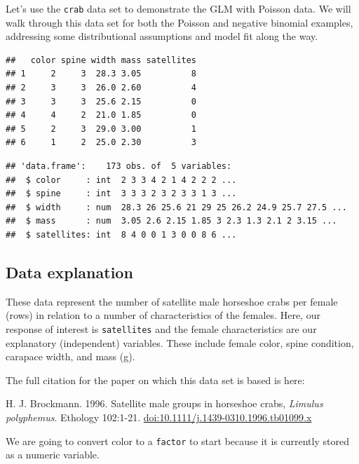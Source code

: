\documentclass[
]{book}
\newenvironment{Shaded}{\begin{snugshade}}{\end{snugshade}}
\newcommand{\CommentTok}[1]{\textcolor[rgb]{0.56,0.35,0.01}{\textit{#1}}}
\newcommand{\KeywordTok}[1]{\textcolor[rgb]{0.13,0.29,0.53}{\textbf{#1}}}
\newcommand{\NormalTok}[1]{#1}
\newcommand{\OperatorTok}[1]{\textcolor[rgb]{0.81,0.36,0.00}{\textbf{#1}}}
\newcommand{\StringTok}[1]{\textcolor[rgb]{0.31,0.60,0.02}{#1}}
\begin{document}
Let's use the \texttt{crab} data set to demonstrate the GLM with Poisson data. We will walk through this data set for both the Poisson and negative binomial examples, addressing some distributional assumptions and model fit along the way.

\begin{verbatim}
##   color spine width mass satellites
## 1     2     3  28.3 3.05          8
## 2     3     3  26.0 2.60          4
## 3     3     3  25.6 2.15          0
## 4     4     2  21.0 1.85          0
## 5     2     3  29.0 3.00          1
## 6     1     2  25.0 2.30          3
\end{verbatim}

\begin{verbatim}
## 'data.frame':	173 obs. of  5 variables:
##  $ color     : int  2 3 3 4 2 1 4 2 2 2 ...
##  $ spine     : int  3 3 3 2 3 2 3 3 1 3 ...
##  $ width     : num  28.3 26 25.6 21 29 25 26.2 24.9 25.7 27.5 ...
##  $ mass      : num  3.05 2.6 2.15 1.85 3 2.3 1.3 2.1 2 3.15 ...
##  $ satellites: int  8 4 0 0 1 3 0 0 8 6 ...
\end{verbatim}

\hypertarget{data-explanation}{%
\subsection{Data explanation}\label{data-explanation}}

These data represent the number of satellite male horseshoe crabs per female (rows) in relation to a number of characteristics of the females. Here, our response of interest is \texttt{satellites} and the female characteristics are our explanatory (independent) variables. These include female color, spine condition, carapace width, and mass (g).

The full citation for the paper on which this data set is based is here:

H. J. Brockmann. 1996. Satellite male groups in horseshoe crabs, \emph{Limulus polyphemus}. Ethology 102:1-21. \href{https://onlinelibrary.wiley.com/doi/abs/10.1111/j.1439-0310.1996.tb01099.x}{doi:10.1111/j.1439-0310.1996.tb01099.x}

We are going to convert color to a \texttt{factor} to start because it is currently stored as a numeric variable.

\begin{Shaded}
\end{Shaded}
\end{document}
